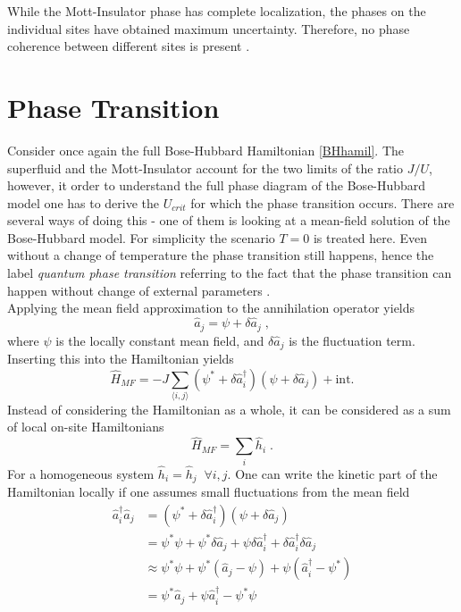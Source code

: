 While the Mott-Insulator phase has complete localization, the phases on the individual sites have obtained maximum uncertainty. Therefore, no phase coherence between different sites is present \cite{greiner}.


\section{Phase Transition}
Consider once again the full Bose-Hubbard Hamiltonian \eqref{BHhamil}. The superfluid and the Mott-Insulator account for the two limits of the ratio $J/U$, however, it order to understand the full phase diagram of the Bose-Hubbard model one has to derive the $U_{crit}$ for which the phase transition occurs. There are several ways of doing this - one of them is looking at a mean-field solution of the Bose-Hubbard model. For simplicity the scenario $T=0$ is treated here. Even without a change of temperature the phase transition still happens, hence the label \textit{quantum phase transition} referring to the fact that the phase transition can happen without change of external parameters \cite{Sachdev2007QPT}.\\
Applying the mean field approximation to the annihilation operator yields
\begin{equation}
	\hat{a}_j = \psi + \delta \hat{a}_j \; ,
\end{equation}
where $\psi$ is the locally constant mean field, and $\delta \hat{a}_j$ is the fluctuation term. Inserting this into the Hamiltonian yields
\begin{equation}
	\hat{H}_{MF} = -J \sum_{\langle i,j \rangle} \left( \psi^* + \delta \hat{a}_{i}^{\dag} \right) \left( \psi + \delta \hat{a}_{j} \right) + \text{int.}
\end{equation}
Instead of considering the Hamiltonian as a whole, it can be considered as a sum of local on-site Hamiltonians
\begin{equation}
	\hat{H}_{MF} = \sum_{i} \hat{h}_i \; .
\end{equation}
For a homogeneous system $\hat{h}_i = \hat{h}_j \; \; \forall i,j$. One can write the kinetic part of the Hamiltonian locally if one assumes small fluctuations from the mean field
\begin{align}
  \hat{a}_{i}^{\dag} \hat{a}_{j} &= \left( \psi^* + \delta \hat{a}_{i}^{\dag} \right) \left( \psi + \delta \hat{a}_{j} \right) \nonumber \\
  &= \psi^* \psi + \psi^* \delta \hat{a}_j + \psi \delta \hat{a}_{i}^{\dag} + \delta \hat{a}_{i}^{\dag} \delta \hat{a}_{j} \nonumber \\
  & \approx \psi^* \psi + \psi^* \left( \hat{a}_j - \psi \right) + \psi \left( \hat{a}_{i}^{\dag} - \psi^* \right) \nonumber \\
&= \psi^* \hat{a}_j + \psi \hat{a}_{i}^{\dag} - \psi^* \psi
\end{align}
